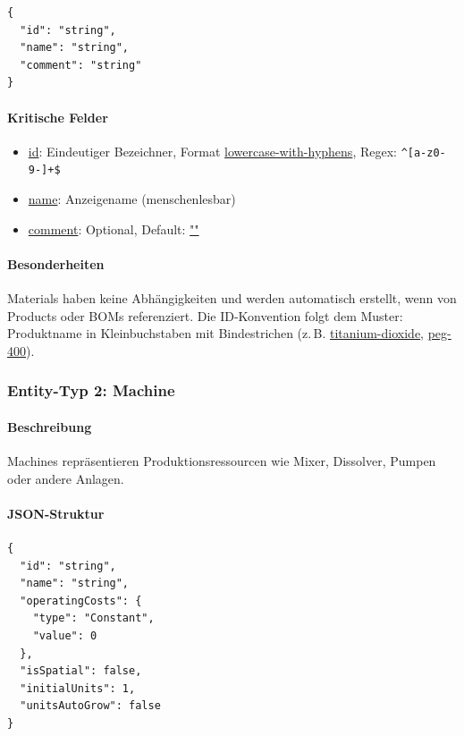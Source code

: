 \begin{verbatim}
{
  "id": "string",
  "name": "string",
  "comment": "string"
}
\end{verbatim}

\paragraph{Kritische Felder}

\begin{itemize}
    \item \url{id}: Eindeutiger Bezeichner, Format \url{lowercase-with-hyphens}, Regex: \verb|^[a-z0-9-]+$|
    \item \url{name}: Anzeigename (menschenlesbar)
    \item \url{comment}: Optional, Default: \url{""}
\end{itemize}

\paragraph{Besonderheiten}

Materials haben keine Abhängigkeiten und werden automatisch erstellt, wenn von Products oder BOMs referenziert. Die ID-Konvention folgt dem Muster: Produktname in Kleinbuchstaben mit Bindestrichen (z.\,B. \url{titanium-dioxide}, \url{peg-400}).

\subsubsection{Entity-Typ 2: Machine}

\paragraph{Beschreibung}

Machines repräsentieren Produktionsressourcen wie Mixer, Dissolver, Pumpen oder andere Anlagen.

\paragraph{JSON-Struktur}

\begin{verbatim}
{
  "id": "string",
  "name": "string",
  "operatingCosts": {
    "type": "Constant",
    "value": 0
  },
  "isSpatial": false,
  "initialUnits": 1,
  "unitsAutoGrow": false
}
\end{verbatim}

